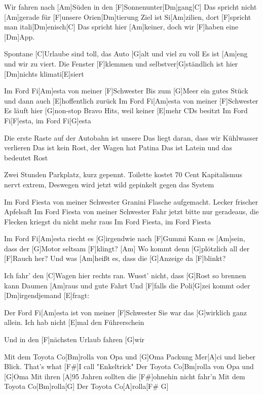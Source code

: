 

\begin{guitar}
	Wir fahren nach [Am]Süden in den [F]Sonnenunter[Dm]gang[C]{}
	Das spricht nicht [Am]gerade für [F]unsere Orien[Dm]tierung
	Ziel ist Si[Am]zilien, dort [F]spricht man itali[Dm]enisch[C]{}
	Das spricht hier [Am]keiner, doch wir [F]haben eine [Dm]App.
	
	Spontane [C]Urlaube sind toll, das Auto [G]alt und viel zu voll
	Es ist [Am]eng und wir zu viert.
	Die Fenster [F]klemmen und selbstver[G]ständlich ist hier [Dm]nichts klimati[E]siert
	
	Im Ford Fi[Am]esta von meiner [F]Schwester
	Bis zum [G]Meer ein gutes Stück und dann auch [E]hoffentlich zurück
	Im Ford Fi[Am]esta von meiner [F]Schwester
	Es läuft hier [G]non-stop Bravo Hits, weil keiner [E]mehr CDs besitzt
	Im Ford Fi[F]esta, im Ford Fi[G]esta
	
	Die erste Raste auf der Autobahn ist unsere
	Das liegt daran, dass wir Kühlwasser verlieren
	Das ist kein Rost, der Wagen hat Patina
	Das ist Latein und das bedeutet Rost
	
	Zwei Stunden Parkplatz, kurz gepennt. Toilette kostet 70 Cent
	Kapitalismus nervt extrem,
	Deswegen wird jetzt wild gepinkelt gegen das System
	
	Im Ford Fiesta von meiner Schwester
	Granini Flasche aufgemacht. Lecker frischer Apfelsaft
	Im Ford Fiesta von meiner Schwester
	Fahr jetzt bitte nur geradeaus, die Flecken kriegst du nicht mehr raus
	Im Ford Fiesta, im Ford Fiesta
	
	Im Ford Fi[Am]esta riecht es [G]irgendwie nach [F]Gummi
	Kann es [Am]sein, dass der [G]Motor seltsam [F]klingt?
	[Am] Wo kommt denn [G]plötzlich all der [F]Rauch her?
	Und was [Am]heißt es, dass die [G]Anzeige da [F]blinkt?
	
	Ich fahr' den [C]Wagen hier rechts ran. Wusst' nicht, dass [G]Rost so brennen kann
	Daumen [Am]raus und gute Fahrt
	Und [F]falls die Poli[G]zei kommt oder [Dm]irgendjemand [E]fragt:
	
	Der Ford Fi[Am]esta ist von meiner [F]Schwester
	Sie war das [G]wirklich ganz allein. Ich hab nicht [E]mal den Führerschein
	
	Und in den [F]nächsten Urlaub fahren [G]wir
	
	Mit dem Toyota Co[Bm]rolla von Opa und [G]Oma
	Packung Mer[A]ci und lieber Blick. That's what [F#]I call "Enkeltrick"
	Der Toyota Co[Bm]rolla von Opa und [G]Oma
	Mit ihren [A]95 Jahren sollten die [F#]ohnehin nicht fahr'n	
	Mit dem Toyota Co[Bm]rolla[G]{}
	Der Toyota Co[A]rolla[F# G]{}
\end{guitar}